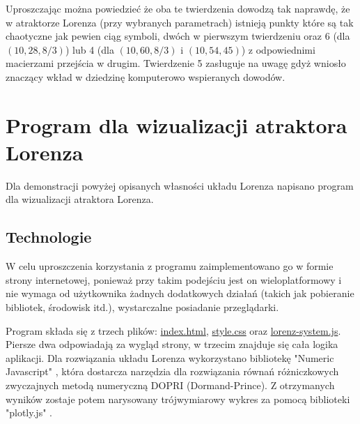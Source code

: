 \documentclass[12pt]{report}
\begin{document}
	\par Uproszczając można powiedzieć że oba te twierdzenia dowodzą tak naprawdę, że w atraktorze Lorenza (przy wybranych parametrach) istnieją punkty które są tak chaotyczne jak pewien ciąg symboli, dwóch w pierwszym twierdzeniu oraz 6 (dla $(10, 28, 8/3)$) lub 4 (dla $(10, 60, 8/3)$ i $(10, 54, 45)$) z odpowiednimi macierzami przejścia w drugim. Twierdzenie 5 zasługuje na uwagę gdyż wniosło znaczący wkład w dziedzinę komputerowo wspieranych dowodów.

\chapter{Program dla wizualizacji atraktora Lorenza}
	\par Dla demonstracji powyżej opisanych własności układu Lorenza napisano program dla wizualizacji atraktora Lorenza.
	
	\section{Technologie}
	\par W celu uproszczenia korzystania z programu zaimplementowano go w formie strony internetowej, ponieważ przy takim podejściu  jest on wieloplatformowy i nie wymaga od użytkownika żadnych dodatkowych działań (takich jak pobieranie bibliotek, środowisk itd.), wystarczalne posiadanie przeglądarki.
	
	\par Program składa się z trzech plików: \hyperref[sec:html]{index.html}, \hyperref[sec:css]{style.css} oraz \hyperref[sec:js]{lorenz-system.js}. Piersze dwa odpowiadają za wygląd strony, w trzecim znajduje się cała logika aplikacji. Dla rozwiązania układu Lorenza wykorzystano bibliotekę "Numeric Javascript" \cite{NumJS}, która dostarcza narzędzia dla rozwiązania równań różniczkowych zwyczajnych metodą numeryczną DOPRI (Dormand-Prince). Z otrzymanych wyników zostaje potem narysowany trójwymiarowy wykres za pomocą biblioteki "plotly.js" \cite{Plotly}.
	
\end{document}
